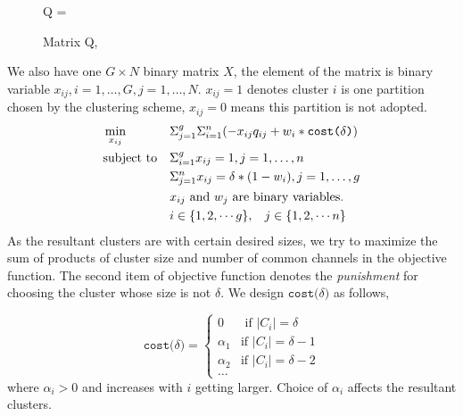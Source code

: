 \begin{figure}[ht!]
\centering
Q = 	
\caption{Matrix Q, }
\label{xx}
\end{figure}

We also have one $G\times N$ binary matrix $X$, the element of the matrix is binary variable $x_{ij},i=1, \ldots, G, j=1, \ldots, N$.
$x_{ij}=1$ denotes cluster $i$ is one partition chosen by the clustering scheme, $x_{ij}=0$ means this partition is not adopted.
\begin{equation}
\begin{aligned}
     &\min\limits_{x_{ij}} && \Sigma_{j=1}^g\Sigma_{i=1}^n (-x_{ij}q_{ij} + w_i*\texttt{cost($\delta$)}) \\
     &\text{subject to}   && \Sigma_{i=1}^g x_{ij} = 1,  j=1, \ldots, n \\
   &&& \Sigma_{j=1}^n x_{ij} = \delta*(1-w_i), j=1, \ldots, g \\
   &&& \text{$x_{ij}$ and $w_j$ are binary variables.}\\
   &&& i\in \{1,2, \cdots g\}, \hspace{0.3cm} j\in \{1,2,\cdots n\}
\notag
\end{aligned}
\end{equation}
As the resultant clusters are with certain desired sizes, we try to maximize the sum of products of cluster size and number of common channels in the objective function.
The second item of objective function denotes the \textit{punishment} for choosing the cluster whose size is not $\delta$.
We design $\texttt{cost($\delta$)}$ as follows,

$$
\texttt{cost($\delta$)} = \left\{ \begin{array}{rl}
0 &\mbox{ if $|C_i|=\delta$} \\
\alpha_1 &\mbox{if $|C_i|=\delta-1$} \\
\alpha_2 &\mbox{if $|C_i|=\delta-2$} \\
\dots
\end{array} \right.
$$
where $\alpha_i>0$ and increases with $i$ getting larger.
Choice of $\alpha_i$ affects the resultant clusters.

